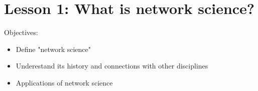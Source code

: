 \documentclass[11pt]{scrartcl} %
\title{\fontsize{40pt}{40pt} \selectfont{CS-7280: Network Science}}
\author{\textaut{Fiona Ding}}
\date{\textdt{OMSCS Summer 2022}}
\begin{document}
\maketitle


\tableofcontents
\newpage


\section{Lesson 1: What is network science?}

Objectives:
\begin{itemize}
	\item Define "network science"
	\item Underestand its history and connections with other disciplines
	\item Applications of network science
\end{itemize}
\end{document}

